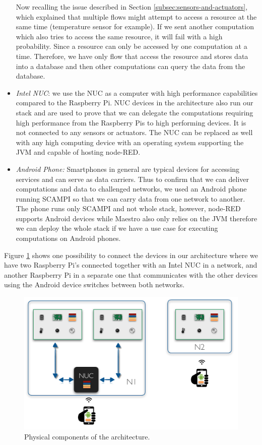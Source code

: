 \begin{itemize}
\noindent Now recalling the issue described in Section \ref{subsec:sensors-and-actuators}, which explained that multiple flows might attempt to access a resource at the same time (temperature sensor for example). If we sent another computation which also tries to access the same resource, it will fail with a high probability. Since a resource can only be accessed by one computation at a time. Therefore, we have only flow that access the resource and stores data into a database and then other computations can query the data from the database.

\item \textit{Intel NUC}: we use the NUC as a computer with high performance capabilities compared  to the Raspberry Pi. NUC devices in the architecture also run our stack and  are used to prove that we can delegate the computations requiring high performance from the Raspberry Pis to high performing devices. It is not connected to any sensors or actuators. The NUC can be replaced as well with any high computing device with an operating system supporting the JVM  and capable of hosting node-RED. 

\item\textit{Android Phone:} Smartphones in general are typical devices for accessing services and can serve as data carriers. Thus to confirm that we can deliver computations and data to challenged networks, we used an Android phone running SCAMPI so that we can carry data from one network to another. The phone runs only SCAMPI and not whole stack, however, node-RED supports Android devices while Maestro also only relies on the JVM therefore we can deploy the whole stack if we have a use case for executing computations on Android phones.

\end{itemize}

\noindent Figure \ref{fig:components} shows one possibility to connect the devices in our architecture where we have two Raspberry Pi's connected together with an Intel NUC in a network, and another Raspberry Pi in a separate one that communicates with the other devices using the Android device  switches between both networks.
\begin{figure}[H]
	\centering
	\includegraphics[scale=0.5]{images/components.png}
	\caption{Physical components of the architecture. }
	\label{fig:components}
\end{figure}



